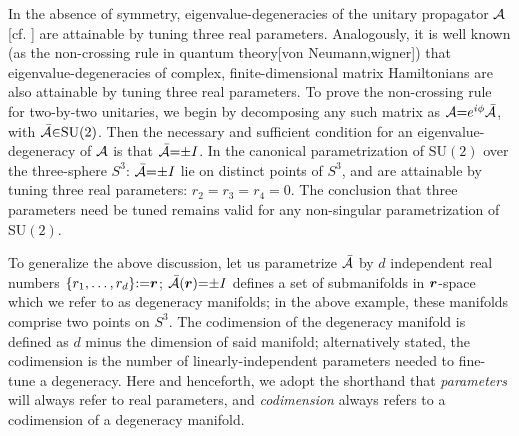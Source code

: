 \documentclass[aps, prb, showpacs, twocolumn, notitlepage, superscriptaddress]{revtex4-1}
\begin{document}
In the absence of symmetry,  eigenvalue-degeneracies of the unitary propagator ${\cal A}$ [cf. ] are attainable by tuning three real parameters. Analogously, it is well known (as the non-crossing rule in quantum theory[von Neumann,wigner]) that eigenvalue-degeneracies of complex, finite-dimensional matrix Hamiltonians are also attainable by tuning three real parameters.
 To prove the non-crossing rule for two-by-two unitaries, we begin by decomposing any such matrix as ${\cal A}{=}e^{i\phi}{\cal \bar{A}}$, with  ${\cal \bar{A}}{\in}\text{SU}(2)$. Then the necessary and sufficient condition for an eigenvalue-degeneracy of ${\cal A}$ is that ${\cal \bar{A}}{=}{\pm}I$. In the canonical parametrization of $\text{SU}(2)$ over the three-sphere $S^3$: 
${\cal \bar{A}}{=}{\pm}I$ lie on distinct points of $S^3$, and are attainable by tuning three real parameters: $r_2{=}r_3{=}r_4{=}0$. The conclusion that three parameters need be tuned remains valid for any  non-singular parametrization of SU$(2)$.


 
 
 To generalize the above discussion, let us parametrize ${\cal \bar{A}}$ by $d$ independent real numbers  $\{r_1,\ldots,r_{d}\}{:}{=}\boldsymbol{r} $;  ${\cal \bar{A}}(\boldsymbol{r}){=}{\pm}I$ defines a set of submanifolds in $\boldsymbol{r}$-space which we refer to as degeneracy manifolds; in the above example, these manifolds comprise two points on $S^3$. The codimension of the degeneracy manifold  is defined as $d$ minus the dimension of said manifold; alternatively stated, the codimension is the number of linearly-independent parameters needed to fine-tune a degeneracy. Here and henceforth, we adopt the shorthand that  \textit{parameters} will always refer to real parameters, and \textit{codimension} always refers to a codimension of a degeneracy manifold. 

\end{document}

